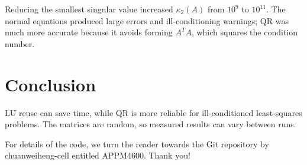 \documentclass[11pt]{article}
\begin{document}
Reducing the smallest singular value increased $\kappa_2(A)$ from
$10^9$ to $10^{11}$. The normal equations produced large errors and
ill-conditioning warnings; QR was much more accurate because it avoids
forming $A^TA$, which squares the condition number.

\section*{Conclusion}

LU reuse can save time, while QR is more reliable for ill-conditioned
least-squares problems. The matrices are random, so measured results
can vary between runs. 

For details of the code, we turn the reader towards the Git repository by chuanweiheng-cell
entitled APPM4600. Thank you!
\end{document}
